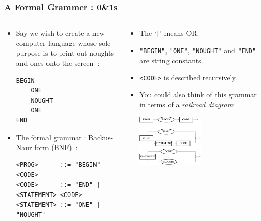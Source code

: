 \begin{frame}[fragile]
\frametitle{A Formal Grammer : 0\&1s}
\begin{columns}[T]

\begin{column}{0.45\textwidth}
\begin{itemize}[<+->]

\item Say we wish to create a new computer language whose sole purpose
is to print out noughts and ones onto the screen~:

\pause
\begin{verbatim}
BEGIN
    ONE
    NOUGHT
    ONE
END
\end{verbatim}

\pause
\item The formal grammar : Backus-Naur form (BNF)~:
{\footnotesize
\begin{verbatim}
<PROG>      ::= "BEGIN" <CODE>
<CODE>      ::= "END" | <STATEMENT> <CODE>
<STATEMENT> ::= "ONE" | "NOUGHT"
\end{verbatim}
}
\end{itemize}

\end{column}

\pause
\begin{column}{0.45\textwidth}
{\small
\begin{itemize}[<+->]
\item The `\verb^|^' means OR.
\item \verb^"BEGIN"^, \verb^"ONE"^, \verb^"NOUGHT"^ and \verb^"END"^ are string constants.
\item \verb^<CODE>^ is described recursively.
\item You could also think of this grammar in terms of a {\it railroad diagram}:
\begin{center}
\includegraphics[width=0.5\textwidth]{../Images/railroad.pdf}
\end{center}
\end{itemize}
}
\end{column}

\end{columns}
\end{frame}


